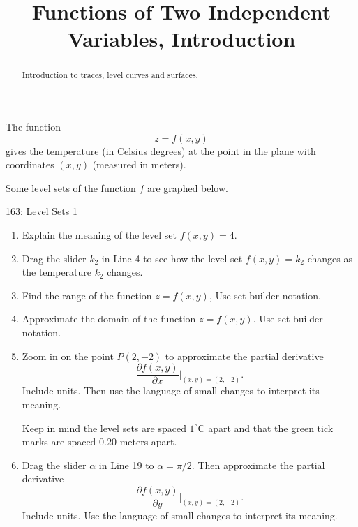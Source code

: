 \documentclass{ximera}
\title{Functions of Two Independent Variables, Introduction}
\begin{document}
\begin{abstract}
Introduction to traces, level curves and surfaces.
\end{abstract}
\maketitle


\begin{example} \label{ExMD3f039}

The function
\[
   z = f(x,y)
\]
gives the temperature (in Celsius degrees) at the point in the plane with coordinates $(x,y)$ (measured in meters).

Some level sets of the function $f$ are graphed below.

\begin{onlineOnly}
    \begin{center}
\end{center}
\end{onlineOnly}

\href{https://www.desmos.com/calculator/ve90qgcwoh}{163: Level Sets 1}

\begin{enumerate}
\item Explain the meaning of the level set $f(x,y)=4$.

\item Drag the slider $k_2$ in Line 4 to see how the level set $f(x,y)=k_2$ changes as the temperature $k_2$ changes. 

\item Find the range of the function $z=f(x,y)$, Use set-builder notation.

\item Approximate the domain of the function $z=f(x,y)$. Use set-builder notation.

\item Zoom in on the point $P(2,-2)$ to approximate the partial derivative
\[
      \frac{\partial f(x,y)}{\partial x}\Big|_{(x,y)=(2,-2)}.
\]
Include units. Then use the language of small changes to interpret its meaning.

Keep in mind the level sets are spaced $1^\circ$C apart and that the green tick marks are spaced $0.20$ meters apart.

\item Drag the slider $\alpha$ in Line 19 to $\alpha=\pi/2$. Then approximate the partial derivative
\[
          \frac{\partial f(x,y)}{\partial y}\Big|_{(x,y)=(2,-2)} .
\]
Include units. Use the language of small changes to interpret its meaning.


\end{enumerate}
\end{example}
\end{document}
